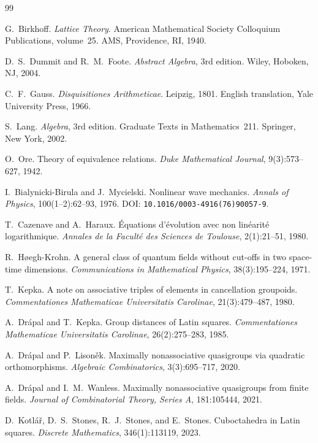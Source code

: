 \documentclass[11pt,reqno]{amsart}
\theoremstyle{plain}
\theoremstyle{definition}
\theoremstyle{remark}
\begin{document}
\begin{thebibliography}{99}

G.~Birkhoff.
\newblock \emph{Lattice Theory}.
\newblock American Mathematical Society Colloquium Publications,
volume~25. AMS, Providence, RI, 1940.

D.~S.~Dummit and R.~M.~Foote.
\newblock \emph{Abstract Algebra}, 3rd edition.
\newblock Wiley, Hoboken, NJ, 2004.

C.~F.~Gauss.
\newblock \emph{Disquisitiones Arithmeticae}.
\newblock Leipzig, 1801.
\newblock English translation, Yale University Press, 1966.

S.~Lang.
\newblock \emph{Algebra}, 3rd edition.
\newblock Graduate Texts in Mathematics~211. Springer, New York, 2002.

O.~Ore.
\newblock Theory of equivalence relations.
\newblock \emph{Duke Mathematical Journal}, 9(3):573--627, 1942.

I.~Bialynicki-Birula and J.~Mycielski.
\newblock Nonlinear wave mechanics.
\newblock \emph{Annals of Physics}, 100(1--2):62--93, 1976.
\newblock DOI: \texttt{10.1016/0003-4916(76)90057-9}.

T.~Cazenave and A.~Haraux.
\newblock \'Equations d'\'evolution avec non lin\'earit\'e logarithmique.
\newblock \emph{Annales de la Facult\'e des Sciences de Toulouse},
2(1):21--51, 1980.

R.~H{\o}egh-Krohn.
\newblock A general class of quantum fields without cut-offs in two
space-time dimensions.
\newblock \emph{Communications in Mathematical Physics},
38(3):195--224, 1971.

T.~Kepka.
\newblock A note on associative triples of elements in cancellation groupoids.
\newblock \emph{Commentationes Mathematicae Universitatis Carolinae},
21(3):479--487, 1980.

A.~Dr\'{a}pal and T.~Kepka.
\newblock Group distances of Latin squares.
\newblock \emph{Commentationes Mathematicae Universitatis Carolinae},
26(2):275--283, 1985.

A.~Dr\'{a}pal and P.~Lison\v{e}k.
\newblock Maximally nonassociative quasigroups via quadratic orthomorphisms.
\newblock \emph{Algebraic Combinatorics}, 3(3):695--717, 2020.

A.~Dr\'{a}pal and I.~M.~Wanless.
\newblock Maximally nonassociative quasigroups from finite fields.
\newblock \emph{Journal of Combinatorial Theory, Series A}, 181:105444, 2021.

D.~Kotl\'{a}\v{r}, D.~S.~Stones, R.~J.~Stones, and E.~Stones.
\newblock Cuboctahedra in Latin squares.
\newblock \emph{Discrete Mathematics}, 346(1):113119, 2023.

\end{thebibliography}
\end{document}
